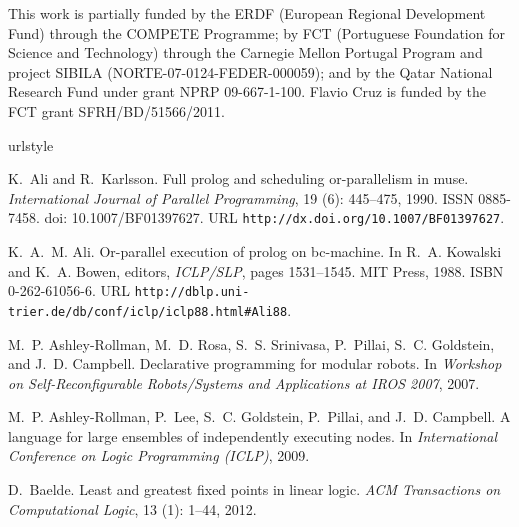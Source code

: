 \documentclass{sigplanconf}
\begin{document}
\makeatletter{}\acks

This work is partially funded by the ERDF (European Regional
Development Fund) through the COMPETE Programme; by FCT (Portuguese
Foundation for Science and Technology) through the Carnegie Mellon
Portugal Program and project SIBILA (NORTE-07-0124-FEDER-000059); and
by the Qatar National Research Fund under grant NPRP
09-667-1-100. Flavio Cruz is funded by the FCT grant
SFRH/BD/51566/2011.
 

\balance





\begin{thebibliography}{35}
\providecommand{\natexlab}[1]{#1}
\providecommand{\url}[1]{\texttt{#1}}
\expandafter\ifx\csname urlstyle\endcsname\relax
  \providecommand{\doi}[1]{doi: #1}\else
  \providecommand{\doi}{doi: \begingroup \urlstyle{rm}\Url}\fi

K.~Ali and R.~Karlsson.
\newblock Full prolog and scheduling or-parallelism in muse.
\newblock \emph{International Journal of Parallel Programming}, 19
  (6): 445--475, 1990.
\newblock ISSN 0885-7458.
\newblock \doi{10.1007/BF01397627}.
\newblock URL \url{http://dx.doi.org/10.1007/BF01397627}.

K.~A.~M. Ali.
\newblock Or-parallel execution of prolog on bc-machine.
\newblock In R.~A. Kowalski and K.~A. Bowen, editors, \emph{ICLP/SLP}, pages
  1531--1545. MIT Press, 1988.
\newblock ISBN 0-262-61056-6.
\newblock URL \url{http://dblp.uni-trier.de/db/conf/iclp/iclp88.html#Ali88}.

M.~P. Ashley-Rollman, M.~D. Rosa, S.~S. Srinivasa, P.~Pillai, S.~C. Goldstein,
  and J.~D. Campbell.
\newblock Declarative programming for modular robots.
\newblock In \emph{Workshop on Self-Reconfigurable Robots/Systems and
  Applications at IROS 2007}, 2007.

M.~P. Ashley-Rollman, P.~Lee, S.~C. Goldstein, P.~Pillai, and J.~D. Campbell.
\newblock A language for large ensembles of independently executing nodes.
\newblock In \emph{International Conference on Logic Programming (ICLP)}, 2009.

D.~Baelde.
\newblock Least and greatest fixed points in linear logic.
\newblock \emph{ACM Transactions on Computational Logic}, 13
  (1): 1--44, 2012.


\end{thebibliography}
\end{document}
